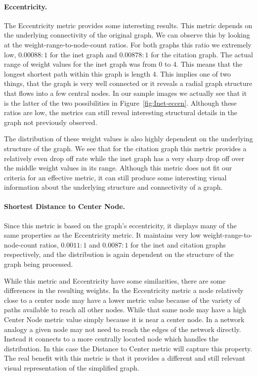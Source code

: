 \paragraph*{Eccentricity.}
The Eccentricity metric provides some interesting results.  This metric depends on the underlying connectivity of the original graph.  We can observe this by looking at the weight-range-to-node-count ratios.  For both graphs this ratio we extremely low, $0.00088:1$ for the inet graph and $0.00878:1$ for the citation graph.  The actual range of weight values for the inet graph was from 0 to 4.  This means that the longest shortest path within this graph is length 4.  This implies one of two things, that the graph is very well connected or it reveals a radial graph structure that flows into a few central nodes.  In our sample images we actually see that it is the latter of the two possibilities in Figure~\ref{fig:Inet-eccen}.  Although these ratios are low, the metrics can still reveal interesting structural details in the graph not previously observed.

The distribution of these weight values is also highly dependent on the underlying structure of the graph.  We see that for the citation graph this metric provides a relatively even drop off rate while the inet graph has a very sharp drop off over the middle weight values in its range.  Although this metric does not fit our criteria for an effective metric, it can still produce some interesting visual information about the underlying structure and connectivity of a graph.

\paragraph*{Shortest Distance to Center Node.}
Since this metric is based on the graph's eccentricity, it displays many of the same properties as the Eccentricity metric.  It maintains very low weight-range-to-node-count ratios, $0.0011:1$ and $0.0087:1$ for the inet and citation graphs respectively, and the distribution is again dependent on the structure of the graph being processed.

While this metric and Eccentricity have some similarities, there are some differences in the resulting weights.  In the Eccentricity metric a node relatively close to a center node may have a lower metric value because of the variety of paths available to reach all other nodes.  While that same node may have a high Center Node metric value simply because it is near a center node.  In a network analogy a given node may not need to reach the edges of the network directly.  Instead it connects to a more centrally located node which handles the distribution.  In this case the Distance to Center metric will capture this property.  The real benefit with this metric is that it provides a different and still relevant visual representation of the simplified graph.

